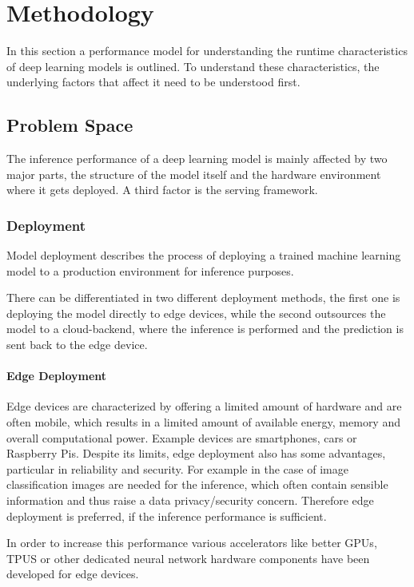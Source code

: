 \chapter{Methodology}
\label{chap:methodology}
In this section a performance model for understanding the runtime characteristics of deep learning models is outlined. To understand these characteristics, the underlying factors that affect it need to be understood first. 


\section{Problem Space}
The inference performance of a deep learning model is mainly affected by two major parts, the structure of the model itself and the hardware environment where it gets deployed. A third factor is the serving framework.

\subsection{Deployment}
Model deployment describes the process of deploying a trained machine learning model to a production environment for inference purposes. 

There can be differentiated in two different deployment methods, the first one is deploying the model directly to edge devices, while the second outsources the model to a cloud-backend, where the inference is performed and the prediction is sent back to the edge device.
\subsubsection{Edge Deployment}
Edge devices are characterized by offering a limited amount of hardware and are often mobile, which results in a limited amount of available energy, memory and overall computational power.
Example devices are smartphones, cars or Raspberry Pis.
Despite its limits, edge deployment also has some advantages, particular in reliability and security. 
For example in the case of image classification images are needed for the inference, which often contain sensible information and thus raise a data privacy/security concern.
Therefore edge deployment is preferred, if the inference performance is sufficient.

In order to increase this performance various accelerators like better GPUs, TPUS or other dedicated neural network hardware components have been developed for edge devices.

